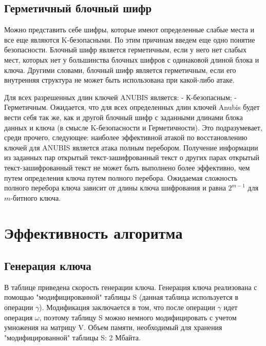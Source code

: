 \documentclass[12pt]{article}
\begin{document}
\subsection{Герметичный блочный шифр}
Можно представить себе шифры, которые имеют определенные слабые места и все еще являются K-безопасными. По этим причинам введем еще одно понятие безопасности.
Блочный шифр является герметичным, если у него нет слабых мест, которых нет у большинства блочных шифров с одинаковой длиной блока и ключа. Другими словами, блочный шифр является герметичным, если его внутренняя структура не может быть использована при какой-либо атаке.

Для всех разрешенных длин ключей ANUBIS является:
\newline
- К-безопасным;
\newline
- Герметичным.
\newline
Ожидается, что для всех определенных длин ключей Anubis будет вести себя так же, как и  другой блочный шифр с заданными длинами блока данных и ключа (в смысле K-безопасности и Герметичности). Это подразумевает, среди прочего, следующее: наиболее эффективной атакой по восстановлению ключей для ANUBIS является атака полным перебором. Получение информации из заданных пар открытый текст-зашифрованный текст о других парах открытый текст-зашифрованный текст не может быть выполнено более эффективно, чем путем определения ключа путем полного перебора. Ожидаемая сложность полного перебора ключа зависит от длины ключа шифрования и равна $2^{m-1}$ для $m$-битного ключа. 

\section{Эффективность алгоритма}

\subsection{Генерация ключа}
В таблице приведена скорость генерации ключа. Генерация ключа реализована с помощью "модифицированной" таблицы S (данная таблица используется в операции $\gamma$). Модификация заключается в том, что после операции $\gamma$ идет операция $\omega$, поэтому таблицу S можно немного модифицировать с учетом умножения на матрицу V. Объем памяти, необходимый для хранения "модифицированной" таблицы S: 2 Мбайта.
\end{document}
